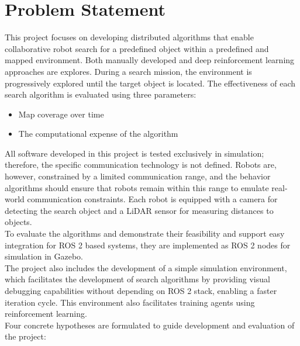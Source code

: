 \section{Problem Statement}
\label{sec:problem-statement}

This project focuses on developing distributed algorithms that enable collaborative robot search for a predefined object within a predefined and mapped environment. Both manually developed and deep reinforcement learning approaches are explores. During a search mission, the environment is progressively explored until the target object is located. The effectiveness of each search algorithm is evaluated using three parameters:

\begin{itemize}
    \item Map coverage over time
    \item The computational expense of the algorithm
\end{itemize}

All software developed in this project is tested exclusively in simulation; therefore, the specific communication technology is not defined. Robots are, however, constrained by a limited communication range, and the behavior algorithms should ensure that robots remain within this range to emulate real-world communication constraints. Each robot is equipped with a camera for detecting the search object and a LiDAR sensor for measuring distances to objects. \\

To evaluate the algorithms and demonstrate their feasibility and support easy integration for ROS 2 based systems, they are implemented as ROS 2 nodes for simulation in Gazebo. \\

The project also includes the development of a simple simulation environment, which facilitates the development of search algorithms by providing visual debugging capabilities without depending on ROS 2 stack, enabling a faster iteration cycle. This environment also facilitates training agents using reinforcement learning. \\

Four concrete hypotheses are formulated to guide development and evaluation of the project:

